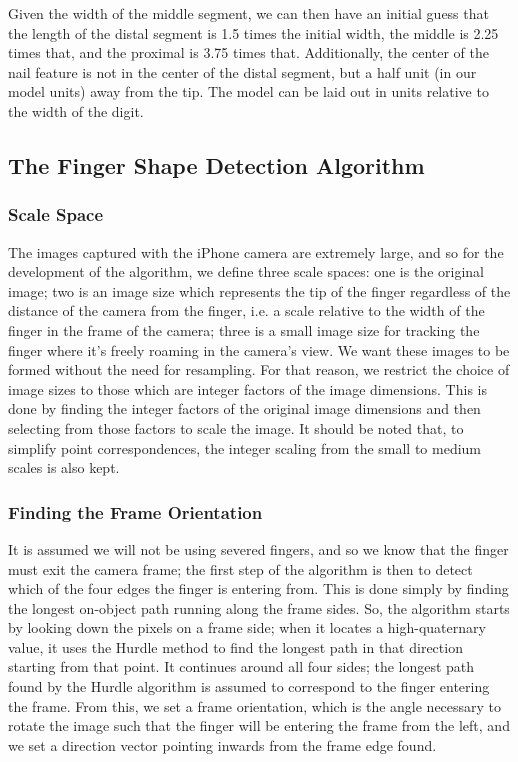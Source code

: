 Given the width of the middle segment, we can then have an initial guess that the length of the distal segment is 1.5 times the initial width, the middle is 2.25 times that, and the proximal is 3.75 times that. Additionally, the center of the nail feature is not in the center of the distal segment, but a half unit (in our model units) away from the tip. The model can be laid out in units relative to the width of the digit.
\subsection{The Finger Shape Detection Algorithm}\label{sec:FingerShapeDetectionAlgorithm}

\subsubsection{Scale Space}\label{sec:ScaleSpace}
The images captured with the iPhone camera are extremely large, and so for the development of the algorithm, we define three scale spaces: one is the original image; two is an image size which represents the tip of the finger regardless of the distance of the camera from the finger, i.e. a scale relative to the width of the finger in the frame of the camera; three is a small image size for tracking the finger where it's freely roaming in the camera's view. We want these images to be formed without the need for resampling. For that reason, we restrict the choice of image sizes to those which are integer factors of the image dimensions. This is done by finding the integer factors of the original image dimensions and then selecting from those factors to scale the image. It should be noted that, to simplify point correspondences, the integer scaling from the small to medium scales is also kept.

\subsubsection{Finding the Frame Orientation}\label{sec:FindingTheFrameOrientation}
It is assumed we will not be using severed fingers, and so we know that the finger must exit the camera frame; the first step of the algorithm is then to detect which of the four edges the finger is entering from. This is done simply by finding the longest on-object path running along the frame sides. So, the algorithm starts by looking down the pixels on a frame side; when it locates a high-quaternary value, it uses the Hurdle method to find the longest path in that direction starting from that point. It continues around all four sides; the longest path found by the Hurdle algorithm is assumed to correspond to the finger entering the frame. From this, we set a frame orientation, which is the angle necessary to rotate the image such that the finger will be entering the frame from the left, and we set a direction vector pointing inwards from the frame edge found.

